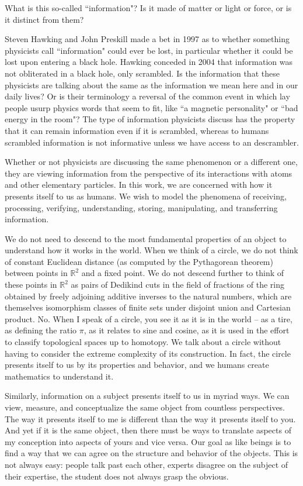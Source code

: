 \documentclass{amsart}
\begin{document}
What is this so-called ``information"?  Is it made of matter or light or force, or is it distinct from them?

Steven Hawking and John Preskill made a bet in 1997 as to whether something physicists call ``information" could ever be lost, in particular whether it could be lost upon entering a black hole.  Hawking conceded in 2004 that information was not obliterated in a black hole, only scrambled.  Is the information that these physicists are talking about the same as the information we mean here and in our daily lives?  Or is their terminology a reversal of the common event in which lay people usurp physics words that seem to fit, like ``a magnetic personality" or ``bad energy in the room"?  The type of information physicists discuss has the property that it can remain information even if it is scrambled, whereas to humans scrambled information is not informative unless we have access to an descrambler.

Whether or not physicists are discussing the same phenomenon or a different one, they are viewing information from the perspective of its interactions with atoms and other elementary particles.  In this work, we are concerned with how it presents itself to us as humans.  We wish to model the phenomena of receiving, processing, verifying, understanding, storing, manipulating, and transferring information.   

We do not need to descend to the most fundamental properties of an object to understand how it works in the world.  When we think of a circle, we do not think of constant Euclidean distance (as computed by the Pythagorean theorem) between points in $\mathbb{R}^2$ and a fixed point.  We do not descend further to think of these points in $\mathbb{R}^2$ as pairs of Dedikind cuts in the field of fractions of the ring obtained by freely adjoining additive inverses to the natural numbers, which are themselves isomorphism classes of finite sets under disjoint union and Cartesian product.  No.  When I speak of a circle, you see it as it is in the world -- as a tire, as defining the ratio $\pi$, as it relates to sine and cosine, as it is used in the effort to classify topological spaces up to homotopy.  We talk about a circle without having to consider the extreme complexity of its construction.  In fact, the circle presents itself to us by its properties and behavior, and we humans create mathematics to understand it.

Similarly, information on a subject presents itself to us in myriad ways.  We can view, measure, and conceptualize the same object from countless perspectives.  The way it presents itself to me is different than the way it presents itself to you.  And yet if it is the same object, then there must be ways to translate aspects of my conception into aspects of yours and vice versa.  Our goal as like beings is to find a way that we can agree on the structure and behavior of the objects.  This is not always easy: people talk past each other, experts disagree on the subject of their expertise, the student does not always grasp the obvious.  
\end{document}
